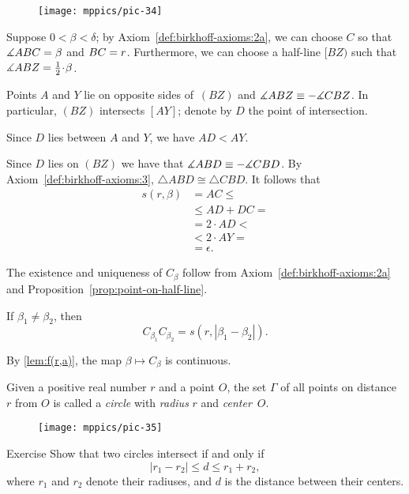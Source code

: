{

\begin{wrapfigure}{o}{36mm}
\centering
\texttt{[image: mppics/pic-34]}
\end{wrapfigure}

Suppose $0<\beta<\delta$;
by Axiom~\ref{def:birkhoff-axioms:2a}, we can choose $C$ so that $\measuredangle ABC=\beta$ and $BC=r$.
Furthermore, we can choose a half-line $[BZ)$ such that $\measuredangle ABZ\z=\tfrac12\cdot \beta$.

Points $A$ and $Y$ lie on opposite sides of~$(BZ)$ and  $\measuredangle ABZ\equiv -\measuredangle CBZ$.
In particular, $(BZ)$ intersects $[AY]$;
denote by $D$ the point of intersection.

Since $D$ lies between $A$ and $Y$, we have $AD<AY$.

Since $D$ lies on $(BZ)$ we have that $\measuredangle ABD\equiv -\measuredangle CBD$.
By Axiom~\ref{def:birkhoff-axioms:3},
$\triangle ABD\cong \triangle CBD$.
It follows that
\begin{align*}
s(r,\beta)&=AC\le
\\
&\le AD+DC=
\\
&=2\cdot AD< 
\\
&< 2\cdot AY=
\\
&=\epsilon.
\end{align*}
\qedsf

}

The existence and uniqueness of $C_\beta$ follow from Axiom~\ref{def:birkhoff-axioms:2a} and Proposition~\ref{prop:point-on-half-line}.

If $\beta_1\ne\beta_2$, then
$$C_{\beta_1}C_{\beta_2}=s(r,|\beta_1-\beta_2|).$$

By \ref{lem:f(r,a)}, the map $\beta\mapsto C_\beta$ is continuous.
\qeds



Given a positive real number $r$ and a point $O$,
the set $\Gamma$ of all points on distance $r$ from $O$ is called a \emph{circle} 
with \emph{radius} $r$ and \emph{center}~$O$.

\begin{wrapfigure}{r}{40mm}
\centering
\texttt{[image: mppics/pic-35]}
\end{wrapfigure}

\begin{thm}{Exercise}\label{ex:intersecting-circles-3}
Show that two circles intersect if and only if 
\[|r_1-r_2|\le d\le r_1+r_2,\]
where $r_1$ and $r_2$ denote their radiuses, and $d$ is the distance between their centers.
\end{thm}
